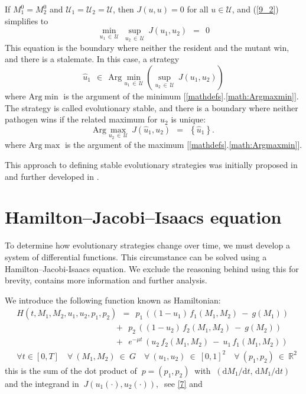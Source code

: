 \documentclass[11pt]{amsart}
\begin{document}
If $ M_1^0 = M_2^0 $ and $ \mathcal{U}_1 = \mathcal{U}_2 = \mathcal{U} ${\rm ,}
then $ J(u, u) = 0 $ for all $ u \in \mathcal{U} ${\rm ,} and {\rm (\ref{9_2})}
simplifies to
\begin{equation}
\min_{u_1 \, \in \, \mathcal{U}} \: \sup_{u_2 \, \in \, \mathcal{U}} \:
  J(u_1, u_2) \:\: = \:\: 0  \label{9_3}
\end{equation}
This equation is the boundary where neither the resident and the mutant win, and there is a stalemate.
In this case{\rm ,} a strategy
$$
\hat{u}_1 \:\: \in \:\: \mathrm{Arg} \min_{u_1 \, \in \, \mathcal{U}}
  \left( \sup_{u_2 \, \in \, \mathcal{U}} \: J(u_1, u_2) \right)
$$
where $\mathrm{Arg} \min$ is the argument of the minimum [\ref{mathdefs}.\ref{math:Argmaxmin}]. The strategy is called evolutionary stable, and there is a boundary where neither pathogen wins if the related maximum for $ u_2 $ is
unique:
$$
\mathrm{Arg} \max_{u_2 \, \in \, \mathcal{U}} \: J \left( \hat{u}_1, u_2
  \right) \:\: = \:\: \left\{ \hat{u}_1 \right\}.
$$
where $\mathrm{Arg}\max$ is the argument of the maximum [\ref{mathdefs}.\ref{math:Argmaxmin}].


This approach to defining stable evolutionary strategies was initially proposed
in \cite{BernhardGrognardMailleretAkhmetzhanov2010} and further developed
in \cite{YegorovGrognardMailleretHalkettBernhard2019}.


\section{Hamilton--Jacobi--Isaacs equation}
To determine how evolutionary strategies change over time, we must develop a system of differential functions. This circumstance can be solved using a Hamilton--Jacobi-Isaacs equation. We exclude the reasoning behind using this for brevity, \cite{YegorovGrognardMailleretHalkettBernhard2019} contains more information and further analysis.

We introduce the following function known as Hamiltonian:
\begin{equation}
\begin{aligned}
& H(t, M_1, M_2, u_1, u_2, p_1, p_2) \:\: = \:\:
p_1 \, \left((1 - u_1) \, f_1(M_1, M_2) \: - \: g(M_1)\right) \\
& \qquad\qquad\qquad\qquad\qquad\quad \:\:\:\,
+ \:\: p_2 \, \left((1 - u_2) \, f_2(M_1, M_2) \: - \: g(M_2)\right) \\
& \qquad\qquad\qquad\qquad\qquad\quad \:\:\:\,
+ \:\: e^{-\mu t} \, (u_2 \, f_2(M_1, M_2) \: - \: u_1 \, f_1(M_1, M_2)) \\
& \forall t \in [0, T] \quad \forall \: (M_1, M_2) \: \in \: G \quad \forall
  \: (u_1, u_2) \: \in \: [0, 1]^2 \quad
\forall \: (p_1, p_2) \: \in \: \mathbb{R}^2
\end{aligned}  \label{12}
\end{equation}
this is the sum of the dot product of $ \: p = (p_1, p_2) \: $ with
$ \: (\mathrm{d} M_1 / \mathrm{d} t, \, \mathrm{d} M_1 / \mathrm{d} t) \: $ and
the integrand in $ \: J(u_1(\cdot), u_2(\cdot)), \: $ see \cref{7} and
\end{document}
